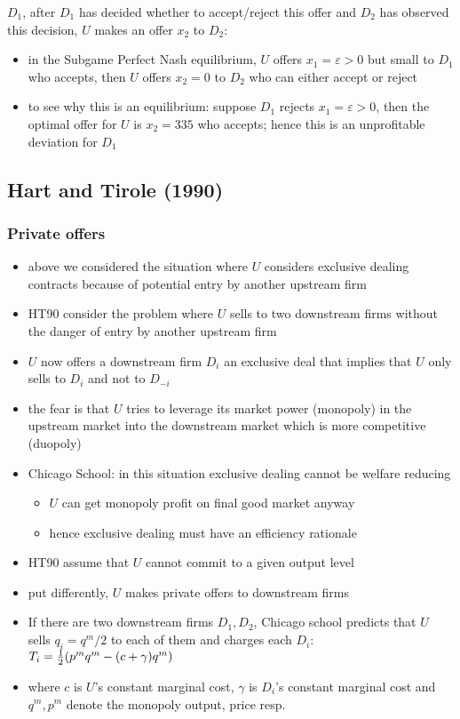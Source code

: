 \documentclass[11pt,english]{beamer}
\newcommand{\hf}{{\textstyle{1\over 2}}}
\newcommand{\ve}{\varepsilon}
\begin{document}
\begin{frame}[allowframebreaks]
\begin{itemize}
    $D_1$, after $D_1$ has decided whether to accept/reject this offer
    and $D_2$ has observed this decision, $U$ makes an offer $x_2$ to $D_2$:
    \begin{itemize}
    \item in the Subgame Perfect Nash equilibrium, $U$ offers $x_1 = \ve >0$
      but small to $D_1$ who accepts, then $U$ offers $x_2 =0$ to
      $D_2$ who can either accept or reject
    \item to see why this is an equilibrium: suppose $D_1$ rejects
      $x_1 =\ve >0$, then the optimal offer for $U$ is $x_2 = 335$ who
      accepts; hence this is an unprofitable deviation for $D_1$
    \end{itemize}
  \end{itemize} %
\end{frame}

\subsection{Hart and Tirole (1990)}
\begin{frame}[allowframebreaks]\frametitle{Private offers}
  \begin{itemize}
  \item above we considered the situation where $U$ considers
    exclusive dealing contracts because of potential entry by another
    upstream firm
  \item HT90 consider the problem where $U$ sells to two downstream
    firms without the danger of entry by another upstream firm
  \item $U$ now offers a downstream firm $D_i$ an exclusive deal that
    implies that $U$ only sells to $D_i$ and not to $D_{-i}$
  \item the fear is that $U$ tries to leverage its market power
    (monopoly) in the upstream market into the downstream market which
    is more competitive (duopoly)
  \item Chicago School: in this situation exclusive dealing cannot be
    welfare reducing
    \begin{itemize}
    \item $U$ can get monopoly profit on final good market anyway
    \item hence exclusive dealing must have an efficiency rationale
    \end{itemize}
  \item HT90 assume that $U$ cannot commit to a given output level
  \item put differently, $U$ makes private offers to downstream firms
  \item If there are two downstream firms $D_1,D_2$, Chicago school
    predicts that $U$ sells $q_i=q^m/2$ to each of them and charges
    each $D_i$: $T_i=\hf (p^m q^m - (c+\gamma)q^m)$
  \item where $c$ is $U$'s constant marginal cost, $\gamma$ is
    $D_i$'s constant marginal cost and $q^m,p^m$ denote the monopoly
    output, price resp.
  \end{itemize}
\end{frame}
\end{document}

